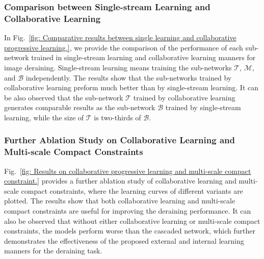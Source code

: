 \documentclass[letterpaper]{article} %
\begin{document}
\subsubsection{Comparison between Single-stream Learning and Collaborative Learning}
%
In Fig.~\ref{fig: Comparative results between single learning and collaborative progressive learning.}, we provide the comparison of the performance of each sub-network trained in single-stream learning and collaborative learning manners for image deraining. Single-stream learning means training the sub-networks $\mathcal{T}$, $\mathcal{M}$, and $\mathcal{B}$ independently. The results show that the sub-networks trained by collaborative learning preform much better than by single-stream learning. It can be also observed that the sub-network $\mathcal{T}$ trained by collaborative learning generates comparable results as the sub-network $\mathcal{B}$ trained by single-stream learning, while the size of $\mathcal{T}$ is two-thirds of $\mathcal{B}$.
%
\subsubsection{Further Ablation Study on Collaborative Learning and Multi-scale Compact Constraints}
%
Fig.~\ref{fig: Results on collaborative progressive learning and multi-scale compact constraint.} provides a further ablation study of collaborative learning and multi-scale compact constraints, where the learning curves of different variants are plotted.
The results show that both collaborative learning and multi-scale compact constraints are useful for improving the deraining performance. It can also be observed that without either collaborative learning or multi-scale compact constraints, the models perform worse than the cascaded network, which further demonstrates the effectiveness of the proposed external and internal learning manners for the deraining task.
%
\end{document}
